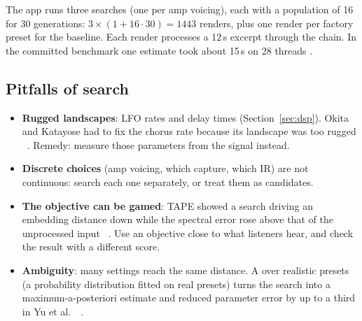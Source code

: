 \begin{worked}[: budget]
The app runs three searches (one per amp voicing), each with a population of
16 for 30 generations: $3 \times (1 + 16\cdot30) = 1443$ renders, plus one
render per factory preset for the baseline. Each render processes a 12\,s
excerpt through the chain. In the committed benchmark one estimate took about
15\,s on 28 threads \measured.
\end{worked}

\subsection{Pitfalls of search}

\begin{itemize}
\item \textbf{Rugged landscapes}: LFO rates and delay times
  (Section~\ref{sec:dsp}). Okita and Katayose had to fix the chorus rate because
  its landscape was too rugged \reported~\cite{okita2026audio}. Remedy: measure
  those parameters from the signal instead.
\item \textbf{Discrete choices} (amp voicing, which capture, which IR) are not
  continuous: search each one separately, or treat them as candidates.
\item \textbf{The objective can be gamed}: TAPE showed a search driving an
  embedding distance down while the spectral error rose above that of the
  unprocessed input \reported~\cite{long2026tape}. Use an objective close to
  what listeners hear, and check the result with a different score.
\item \textbf{Ambiguity}: many settings reach the same distance. A
   over realistic presets (a probability distribution fitted on
  real presets) turns the search into a maximum-a-posteriori estimate and
  reduced parameter error by up to a third in Yu et al.\ \reported~\cite{yu2025improving}.
\end{itemize}
